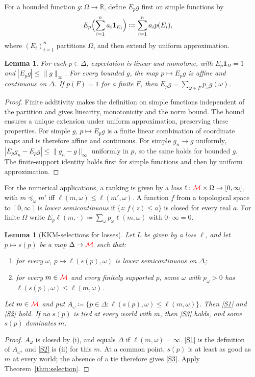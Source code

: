 \documentclass[11pt]{article}
\newcommand{\chg}[1]{{\color{red}#1}}
\newtheorem{lemma}[theorem]{Lemma}
\theoremstyle{definition}
\theoremstyle{remark}
\newcommand{\M}{\mathcal M}
\begin{document}
For a bounded function $g:\Omega\to\mathbb R$, define $E_pg$ first on simple functions by
\[
E_p\Bigl(\sum_{i=1}^n a_i\mathbf1_{E_i}\Bigr)
\coloneqq\sum_{i=1}^n a_i p(E_i),
\]
where $(E_i)_{i=1}^n$ partitions $\Omega$, and then extend by uniform approximation.

\begin{lemma}\label{lem:prob}
For each $p\in\Delta$, expectation is linear and monotone, with $E_p\mathbf1_\Omega=1$ and $|E_pg|\le\|g\|_\infty$. For every bounded $g$, the map $p\mapsto E_pg$ is affine and continuous on $\Delta$. If $p(F)=1$ for a finite $F$, then $E_pg=\sum_{\omega\in F}p_\omega g(\omega)$.
\end{lemma}
\begin{proof}
Finite additivity makes the definition on simple functions independent of the partition and gives linearity, monotonicity and the norm bound. The bound ensures a unique extension under uniform approximation, preserving these properties. For simple $g$, $p\mapsto E_pg$ is a finite linear combination of coordinate maps and is therefore affine and continuous. For simple $g_n\to g$ uniformly, $|E_pg_n-E_pg|\le\|g_n-g\|_\infty$ uniformly in $p$, so the same holds for bounded $g$. The finite-support identity holds first for simple functions and then by uniform approximation.
\end{proof}

For the numerical applications, a ranking is given by a \emph{loss} $\ell:\chg{\M}\times\Omega\to[0,\infty]$, with $m\preceq_\omega m'$ iff $\ell(m,\omega)\le\ell(m',\omega)$. A function $f$ from a topological space to $[0,\infty]$ is \emph{lower semicontinuous} if $\{z:f(z)\le a\}$ is closed for every real $a$. For finite $\Omega$ write $E_p\ell(m,\cdot)\coloneqq\sum_\omega p_\omega\ell(m,\omega)$ with $0\cdot\infty=0$.

\begin{lemma}[KKM-selections for losses]\label{lem:loss-one-stage}
Let $L$ be given by a loss $\ell$, and let $p\mapsto s(p)$ be a map $\Delta\to\chg{\M}$ such that:
\begin{enumerate}[label=(\roman*)]
\item for every $\omega$, $p\mapsto\ell(s(p),\omega)$ is lower semicontinuous on $\Delta$;
\item for every $m\in\chg{\M}$ and every finitely supported $p$, some $\omega$ with $p_\omega>0$ has $\ell(s(p),\omega)\le\ell(m,\omega)$.
\end{enumerate}
Let $m\in\chg{\M}$ and put $A_\omega\coloneqq\{p\in\Delta:\ell(s(p),\omega)\le\ell(m,\omega)\}$. Then \ref{S1} and \ref{S2} hold. If no $s(p)$ is tied at every world with $m$, then \ref{S3} holds, and some $s(p)$ dominates $m$.
\end{lemma}
\begin{proof}
$A_\omega$ is closed by (i), and equals $\Delta$ if $\ell(m,\omega)=\infty$. \ref{S1} is the definition of $A_\omega$, and \ref{S2} is (ii) for this $m$. \chg{At a common point, $s(p)$ is at least as good as $m$ at every world; the absence of a tie therefore gives \ref{S3}.} Apply Theorem~\ref{thm:selection}.
\end{proof}
\end{document}
